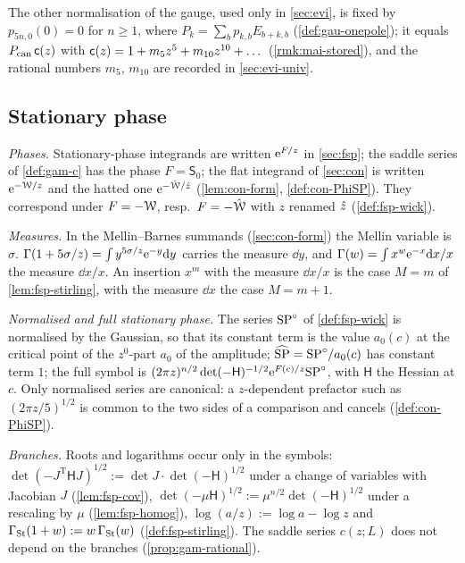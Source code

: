 The other normalisation of the gauge, used only in \cref{sec:evi}, is fixed by $p_{5n,0}(0)=0$ for $n\geq1$, where $P_k=\sum_bp_{k,b}E_{b+k,b}$ (\cref{def:gau-onepole}); it equals $P_{\mathrm{can}}\,\mathsf{c}(z)$ with $\mathsf{c}(z)=1+m_5z^5+m_{10}z^{10}+\dots$ (\cref{rmk:mai-stored}), and the rational numbers $m_5$, $m_{10}$ are recorded in \cref{sec:evi-univ}.

\subsection{Stationary phase}
\label{sec:sgn-sp}

\emph{Phases.} Stationary-phase integrands are written $\mathrm{e}^{F/z}$ in \cref{sec:fsp}; the saddle series of \cref{def:gam-c} has the phase $F=\mathsf S_0$; the flat integrand of \cref{sec:con} is written $\mathrm{e}^{-\mathcal{W}/z}$ and the hatted one $\mathrm{e}^{-\hat{\mathcal{W}}/\hat{z}}$ (\cref{lem:con-form}, \cref{def:con-PhiSP}). They correspond under $F=-\mathcal{W}$, resp.\ $F=-\hat{\mathcal{W}}$ with $z$ renamed $\hat{z}$ (\cref{def:fsp-wick}).

\emph{Measures.} In the Mellin--Barnes summands (\cref{sec:con-form}) the Mellin variable is $\sigma$. $\Gamma(1+5\sigma/z)=\int y^{5\sigma/z}\mathrm{e}^{-y}\mathrm{d} y$ carries the measure $\dd y$, and $\Gamma(w)=\int x^w\mathrm{e}^{-x}\mathrm{d} x/x$ the measure $\dd x/x$. An insertion $x^m$ with the measure $\dd x/x$ is the case $M=m$ of \cref{lem:fsp-stirling}, with the measure $\dd x$ the case $M=m+1$.

\emph{Normalised and full stationary phase.} The series $\mathrm{SP}^{\circ}$ of \cref{def:fsp-wick} is normalised by the Gaussian, so that its constant term is the value $a_0(c)$ at the critical point of the $z^0$-part $a_0$ of the amplitude; $\widehat{\mathrm{SP}}=\mathrm{SP}^{\circ}/a_0(c)$ has constant term $1$; the full symbol is $(2\pi z)^{n/2}\det(-\mathsf H)^{-1/2}\mathrm{e}^{F(c)/z}\mathrm{SP}^{\circ}$, with $\mathsf H$ the Hessian at $c$. Only normalised series are canonical: a $z$-dependent prefactor such as $(2\pi z/5)^{1/2}$ is common to the two sides of a comparison and cancels (\cref{def:con-PhiSP}).

\emph{Branches.} Roots and logarithms occur only in the symbols: $\det(-J^{\mathrm T}\mathsf HJ)^{1/2}:=\det J\cdot\det(-\mathsf H)^{1/2}$ under a change of variables with Jacobian $J$ (\cref{lem:fsp-cov}), $\det(-\mu\mathsf H)^{1/2}:=\mu^{n/2}\det(-\mathsf H)^{1/2}$ under a rescaling by $\mu$ (\cref{lem:fsp-homog}), $\log(a/z):=\log a-\log z$ and $\Gamma_{\mathrm{St}}(1+w):=w\,\Gamma_{\mathrm{St}}(w)$ (\cref{def:fsp-stirling}). The saddle series $c(z;L)$ does not depend on the branches (\cref{prop:gam-rational}).

